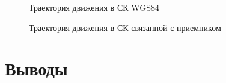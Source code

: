 \documentclass[]{article}
\begin{document}
\begin{figure}[h!]
	
	\caption{Траектория движения в СК WGS84  }
	\label{WGS}
\end{figure}

\begin{figure}[h!]
	
	\caption{Траектория движения в СК связанной с приемником }
	\label{skyv}
\end{figure}


\section{Выводы}
\end{document}
